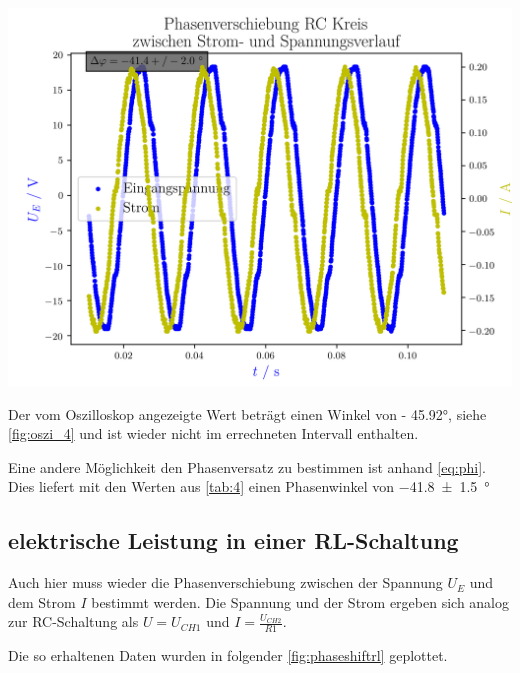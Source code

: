 \documentclass[11pt,ngerman]{scrartcl}
\begin{document}
\begin{center}
	\begin{minipage}[t]{0.8\textwidth}
		\includegraphics[width=\textwidth]{./figures/phaseleistung/Versuch4/phaseshiftrc.png}
		\label{fig:phaseshiftrc}
	\end{minipage}
\end{center}

Der vom Oszilloskop angezeigte Wert beträgt einen Winkel von - 45.92°, siehe \autoref{fig:oszi_4} und ist wieder nicht im errechneten Intervall enthalten.

Eine andere Möglichkeit den Phasenversatz zu bestimmen ist anhand \autoref{eq:phi}.
Dies liefert mit den Werten aus \autoref{tab:4} einen Phasenwinkel von \SI{-41.8(15)}{\degree}





\subsection{elektrische Leistung in einer RL-Schaltung}

Auch hier muss wieder die Phasenverschiebung zwischen der Spannung $U_E$ und dem Strom $I$ bestimmt werden.
Die Spannung und der Strom ergeben sich analog zur RC-Schaltung als $U = U_{CH1}$ und $I = \frac{U_{CH2}}{R1}$.

\vspace{2mm}

Die so erhaltenen Daten wurden in folgender \autoref{fig:phaseshiftrl} geplottet.
\end{document}
